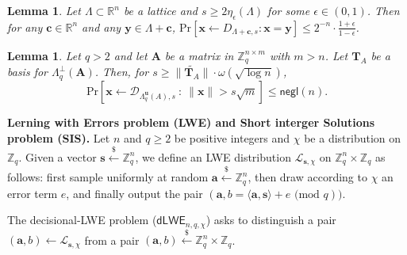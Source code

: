 \documentclass[a4paper,11pt,onecolumn]{elsarticle}
\def\ZZ{\mathbb{Z}}
\def\cal{\mathcal}
\def\bf{\mathbf}
\def\Pr{\mathrm{Pr}}
\def\u{\bf{u}}
\def\x{\bf{x}}
\def\L{\Lambda}
\def\Lp{\Lambda^{\perp}}
\def\DuA{\cal{D}_{\L_q^{\u}(A),s}}
\newtheorem{lemma}[theorem]{Lemma}
\begin{document}
		\begin{lemma} {{\cite[Lemma 2.1]{PR06}}} \label{min-entropy}
	Let $\Lambda \subset \mathbb{R}^n$	be a lattice and $s \geq 2\eta_{\epsilon}(\Lambda)$ for some $\epsilon\in (0,1)$. Then for any $\mathbf{c}\in \mathbb{R}^n$ and any $\mathbf{y}\in \Lambda +\mathbf{c}$, $\Pr[\mathbf{x} \gets D_{\Lambda +\mathbf{c},s}: \mathbf{x}=\mathbf{y}]\leq 2^{-n}\cdot \frac{1+\epsilon}{1-\epsilon}$.
	
		\end{lemma}
	
	
		\begin{lemma} {{\cite[Lemma 4.4]{MR07}}} \label{bound}
			Let $q> 2$ and let $\mathbf{A}$ be a matrix in $\ZZ_q^{n\times m}$ with $m>n$. Let $\mathbf{T}_A$ be a basis for $\Lp_q(\mathbf{A})$. Then, for $s\geq\|\widetilde{\mathbf{T}_A}\|\cdot  \omega(\sqrt{\log n})$,  $$\Pr[\x\gets\DuA~:~\|\x\|>s\sqrt{m}]\leq\mathsf{negl}(n).$$
	
		\end{lemma}
	
	
	\noindent  \textbf{Lerning with Errors problem (LWE) and Short interger Solutions problem (SIS).} Let $n$ and $q \geq 2$ be positive integers and $\chi$ be a distribution on $\mathbb{Z}_q$. Given a vector $\mathbf{s} \xleftarrow{\$} \mathbb{Z}_q^n$, we define an LWE distribution $\mathcal{L}_{\mathbf{s}, \chi}$ on $\mathbb{Z}_q^n \times \mathbb{Z}_q$ as follows: first sample uniformly at random  $\mathbf{a} \xleftarrow{\$} \mathbb{Z}_q^n$, then draw according to $\chi$ an error term $e$, and finally output the pair $(\mathbf{a}, b=\langle \mathbf{a} ,\mathbf{s} \rangle+e \text{ (mod } q))$.
	
	
	\begin{definition}\label{dlwe}
		The decisional-LWE problem ($\mathsf{dLWE}_{n,q,\chi}$) asks to distinguish a pair $(\mathbf{a},b)\leftarrow \mathcal{L}_{\mathbf{s}, \chi} $ from a pair  $(\mathbf{a},b)\xleftarrow{\$}\mathbb{Z}_q^n \times \mathbb{Z}_q$. %
	\end{definition}
	
	
	\iffalse
	
\end{document}
